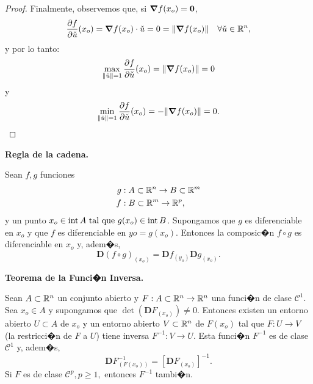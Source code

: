 \documentclass[a4paper]{scrartcl} %
\begin{document}
\begin{theorem}
\begin{proof}
Finalmente, observemos que, si $\grad f(x_o) = \mathbf{0}$, 
\[
 \frac{\partial f}{\partial \check{u}} (x_o) = \grad f (x_o) \cdot \check{u} = 0 = \norm{\grad f(x_o)} \quad \forall \check{u} \in \mathbb{R}^n,
\]
y por lo tanto:
\[
 \max_{\norm{\check{u}}=1} \frac{\partial f}{\partial \check{u}} (x_o) = \norm{\grad f(x_o)} = 0
\]
y
\[
 \min_{\norm{\check{u}}=1} \frac{\partial f}{\partial \check{u}} (x_o) = -\norm{\grad f(x_o)} = 0.
\]

\end{proof}

\end{theorem}

\begin{theorem}\textbf{Regla de la cadena.} \label{teo:cadena}
\mbox{}

  Sean $f, g$ funciones 
    \begin{align*}
    g &:A \subset \mathbb{R}^n \to B \subset \mathbb{R}^m \\
    f &:B \subset \mathbb{R}^m \to \mathbb{R}^p,
    \end{align*}
  y un punto $x_o \in \operatorname{int}{A} \text{ tal que } g(x_o) \in \operatorname{int}{B}$. Supongamos que $g$ es diferenciable en $x_o$ y que $f$ es diferenciable en $yo = g(x_o)$. Entonces la composic�n $f \circ g$ es diferenciable en $x_o$ y, adem�s,
  \[
   \boldsymbol{D}(f \circ g)_{(x_o)} = \boldsymbol{D}f_{(y_o)} 
   \boldsymbol{D}g_{(x_o)}.
  \]
\end{theorem}

\begin{theorem}\textbf{Teorema de la Funci�n Inversa.} \label{teo:inversa}
\mbox{}

 Sean $A \subset \mathbb{R}^n$ un conjunto abierto y $F: A \subset \mathbb{R}^n \to \mathbb{R}^n$ una funci�n de clase $\mathcal{C}^1$. Sea $x_o \in A$ y supongamos que $\det(\boldsymbol{D}F_{(x_o)}) \ne 0$. Entonces existen un entorno abierto $U \subset A$ de $x_o$ y un entorno abierto $V \subset \mathbb{R}^n$ de $F(x_o)$ tal que $F:U \to V$ (la restricci�n de $F$ a $U$) tiene inversa $F^{-1}:V \to U$. Esta funci�n $F^{-1}$ es de clase $\mathcal{C}^1$ y, adem�s,
 \[
  \boldsymbol{D}F^{-1}_{(F(x_o))} = \left[ \boldsymbol{D}F_{(x_o)} \right]^{-1}.
 \]
 Si $F$ es de clase $\mathcal{C}^p, p \ge 1,$ entonces $F^{-1}$ tambi�n.
\end{theorem}
\end{document}
